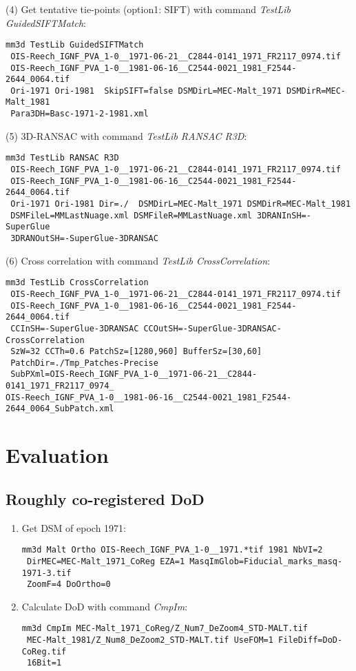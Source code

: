 \begin{enumerate}
(4) Get tentative tie-points (option1: SIFT) with command \textit{TestLib GuidedSIFTMatch}:\\
\begin{verbatim}
mm3d TestLib GuidedSIFTMatch
 OIS-Reech_IGNF_PVA_1-0__1971-06-21__C2844-0141_1971_FR2117_0974.tif     
 OIS-Reech_IGNF_PVA_1-0__1981-06-16__C2544-0021_1981_F2544-2644_0064.tif 
 Ori-1971 Ori-1981  SkipSIFT=false DSMDirL=MEC-Malt_1971 DSMDirR=MEC-Malt_1981 
 Para3DH=Basc-1971-2-1981.xml
\end{verbatim}
(5) 3D-RANSAC with command \textit{TestLib RANSAC R3D}:\\
\begin{verbatim}
mm3d TestLib RANSAC R3D
 OIS-Reech_IGNF_PVA_1-0__1971-06-21__C2844-0141_1971_FR2117_0974.tif  
 OIS-Reech_IGNF_PVA_1-0__1981-06-16__C2544-0021_1981_F2544-2644_0064.tif 
 Ori-1971 Ori-1981 Dir=./  DSMDirL=MEC-Malt_1971 DSMDirR=MEC-Malt_1981 
 DSMFileL=MMLastNuage.xml DSMFileR=MMLastNuage.xml 3DRANInSH=-SuperGlue 
 3DRANOutSH=-SuperGlue-3DRANSAC
\end{verbatim}
(6) Cross correlation with command \textit{TestLib CrossCorrelation}:\\
\begin{verbatim}
mm3d TestLib CrossCorrelation
 OIS-Reech_IGNF_PVA_1-0__1971-06-21__C2844-0141_1971_FR2117_0974.tif 
 OIS-Reech_IGNF_PVA_1-0__1981-06-16__C2544-0021_1981_F2544-2644_0064.tif
 CCInSH=-SuperGlue-3DRANSAC CCOutSH=-SuperGlue-3DRANSAC-CrossCorrelation
 SzW=32 CCTh=0.6 PatchSz=[1280,960] BufferSz=[30,60] 
 PatchDir=./Tmp_Patches-Precise
 SubPXml=OIS-Reech_IGNF_PVA_1-0__1971-06-21__C2844-0141_1971_FR2117_0974_
OIS-Reech_IGNF_PVA_1-0__1981-06-16__C2544-0021_1981_F2544-2644_0064_SubPatch.xml
\end{verbatim}
\end{enumerate}

\section{Evaluation}
\subsection{Roughly co-registered DoD}
\begin{enumerate}

\item{Get \ac{DSM} of epoch 1971:}
\begin{verbatim}
mm3d Malt Ortho OIS-Reech_IGNF_PVA_1-0__1971.*tif 1981 NbVI=2 
 DirMEC=MEC-Malt_1971_CoReg EZA=1 MasqImGlob=Fiducial_marks_masq-1971-3.tif 
 ZoomF=4 DoOrtho=0
\end{verbatim}
\item{Calculate DoD with command \textit{CmpIm}:}
\begin{verbatim}
mm3d CmpIm MEC-Malt_1971_CoReg/Z_Num7_DeZoom4_STD-MALT.tif 
 MEC-Malt_1981/Z_Num8_DeZoom2_STD-MALT.tif UseFOM=1 FileDiff=DoD-CoReg.tif 
 16Bit=1
\end{verbatim}
\end{enumerate}


